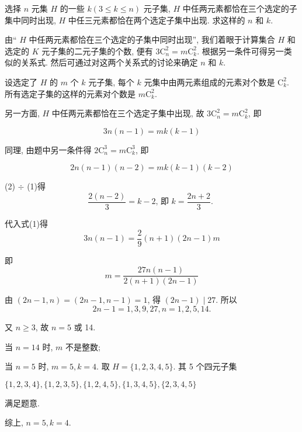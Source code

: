 \begin{example}
	选择 $n$ 元集 $H$ 的一些 $k(3 \leqslant k \leqslant n)$ 元子集, $H$ 中任两元素都恰在三个选定的子集中同时出现, $H$ 中任三元素都恰在两个选定子集中出现. 求这样的 $n$ 和 $k$.
\end{example}

\begin{analysis}
	由“ $H$ 中任两元素都恰在三个选定的子集中同时出现”, 我们着眼于计算集合 $H$ 和选定的 $K$ 元子集的二元子集的个数, 便有 $3 \mathrm{C}_{n}^{2}=m \mathrm{C}_{k}^{2}$. 根据另一条件可得另一类似的关系式. 然后可通过对这两个关系式的讨论来确定 $n$ 和 $k$.
\end{analysis}

\begin{solution}
	设选定了 $H$ 的 $m$ 个 $k$ 元子集, 每个 $k$ 元集中由两元素组成的元素对个数是 $\mathrm{C}_{k}^{2}$. 所有选定子集的这样的元素对个数是 $m \mathrm{C}_{k}^{2}$.

	另一方面, $H$ 中任两元素都恰在三个选定子集中出现, 故 $3 \mathrm{C}_{n}^{2}=m \mathrm{C}_{k}^{2}$, 即


	\begin{equation*}
		3 n(n-1)=m k(k-1) \tag{1}
	\end{equation*}


	同理, 由题中另一条件得 $2 \mathrm{C}_{n}^{3}=m \mathrm{C}_{k}^{3}$, 即


	\begin{equation*}
		2 n(n-1)(n-2)=m k(k-1)(k-2) \tag{2}
	\end{equation*}


	(2) $\div$ (1)得
	$$
		\frac{2(n-2)}{3}=k-2 \text {, 即 } k=\frac{2 n+2}{3} \text {. }
	$$

	代入式(1)得
	$$
		3 n(n-1)=\frac{2}{9}(n+1)(2 n-1) m
	$$

	即
	$$
		m=\frac{27 n(n-1)}{2(n+1)(2 n-1)}
	$$

	由 $(2 n-1, n)=(2 n-1, n-1)=1$, 得 $(2 n-1) \mid 27$. 所以
	$$
		2 n-1=1,3,9,27, n=1,2,5,14 .
	$$

	又 $n \geqslant 3$, 故 $n=5$ 或 14.

	当 $n=14$ 时, $m$ 不是整数;

	当 $n=5$ 时, $m=5, k=4$. 取 $H=\{1,2,3,4,5\}$. 其 5 个四元子集

	$\{1,2,3,4\},\{1,2,3,5\},\{1,2,4,5\},\{1,3,4,5\},\{2,3,4,5\}$

	满足题意.

	综上, $n=5, k=4$.
\end{solution}

